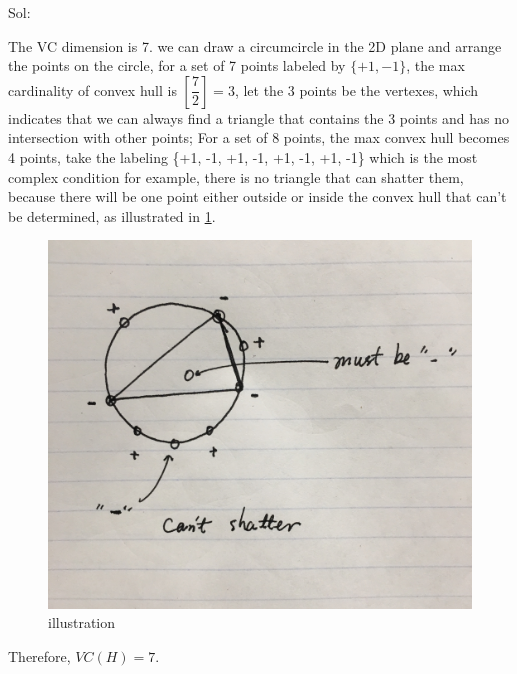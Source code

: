 \documentclass[a4paper,12pt]{article}
\begin{document}
Sol:

The VC dimension is 7. we can draw a circumcircle in the 2D plane and arrange the points on the circle, for a set of 7 points labeled by $\{+1, -1\}$, the max cardinality of convex hull is $\left[\dfrac{7}{2}\right] = 3$, let the 3 points be the vertexes, which indicates that we can always find a triangle that contains the 3 points and has no intersection with other points; For a set of 8 points, the max convex hull becomes 4 points, take the labeling \{+1, -1, +1, -1, +1, -1, +1, -1\} which is the most complex condition for example, there is no triangle that can shatter them, because there will be one point either outside or inside the convex hull that can't be determined, as illustrated in \ref{VC}.

\begin{figure}
\centering
\includegraphics[width = .5\textwidth]{figure/VC.jpeg}
\caption{illustration}
\label{VC}
\end{figure}

Therefore, $VC(H) = 7$.
\end{document}
